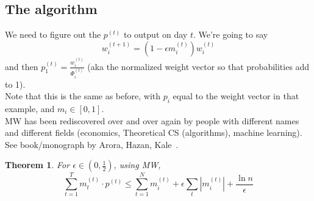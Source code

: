 \documentclass[11pt]{article}
\newtheorem{theorem}{Theorem}
\begin{document}
\subsection{The algorithm}
We need to figure out the $p^{(t)}$ to output on day $t$. We're going to say
\begin{equation}
w_i^{(t+1)} = (1-\epsilon m_i^{(t)}) w_i^{(t)}
\end{equation}
and then $p_1^{(t)} = \frac{w_i^{(t)}}{\Phi^{(t)}_i}$ (aka the normalized weight vector so that probabilities add to 1).\medskip\\
Note that this is the same as before, with $p_i$ equal to the weight vector in that example, and $m_i\in [0,1]$. \medskip\\
MW has been rediscovered over and over again by people with different names and different fields (economics, Theoretical CS (algorithms), machine learning). See book/monograph by Arora, Hazan, Kale~\cite{DBLP:journals/toc/AroraHK12}. 
\begin{theorem}
For $\epsilon\in (0,\frac{1}{2})$, using MW, 
\begin{equation}
\sum_{t=1}^T m_t^{(t)} \cdot p^{(t)}\le \sum_{t=1}^N m_i^{(t)} + \epsilon \sum_t \left\lvert m_i^{(t)}\right\rvert + \frac{\ln n}{\epsilon}
\end{equation}
\end{theorem}
\end{document}
